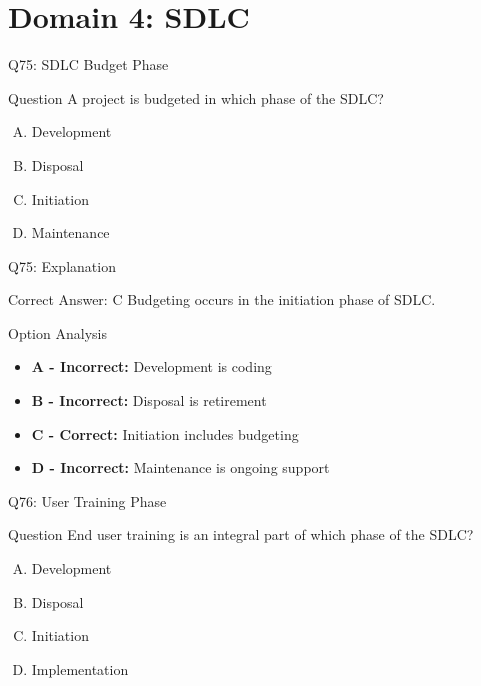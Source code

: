 \documentclass{beamer}
\begin{document}
	\section{Domain 4: SDLC}
	
	\begin{frame}{Q75: SDLC Budget Phase}
		\begin{block}{Question}
			A project is budgeted in which phase of the SDLC?
		\end{block}
		\begin{enumerate}[(A)]
			\item Development
			\item Disposal
			\item Initiation
			\item Maintenance
		\end{enumerate}
	\end{frame}
	
	\begin{frame}{Q75: Explanation}
		\begin{block}{Correct Answer: C}
			Budgeting occurs in the initiation phase of SDLC.
		\end{block}
		\begin{block}{Option Analysis}
			\begin{itemize}
				\item \textbf{A - Incorrect:} Development is coding
				\item \textbf{B - Incorrect:} Disposal is retirement
				\item \textbf{C - Correct:} Initiation includes budgeting
				\item \textbf{D - Incorrect:} Maintenance is ongoing support
			\end{itemize}
		\end{block}
	\end{frame}
	
	\begin{frame}{Q76: User Training Phase}
		\begin{block}{Question}
			End user training is an integral part of which phase of the SDLC?
		\end{block}
		\begin{enumerate}[(A)]
			\item Development
			\item Disposal
			\item Initiation
			\item Implementation
		\end{enumerate}
	\end{frame}
	
\end{document}
